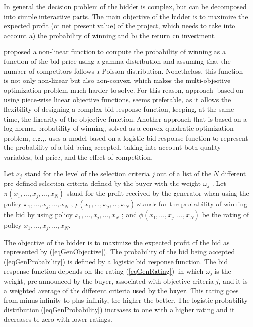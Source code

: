 \documentclass[informs]{informs3}
\begin{document}
In general the decision problem of the bidder is complex, but can be decomposed into simple interactive parts. The main objective of the bidder is to maximize the expected profit (or net present value) of the project, which needs to take into account a) the probability of winning and b) the return on investment. 


\cite{Chen_1989} proposed a non-linear function to compute the probability of winning as a function of the bid price using a gamma distribution and assuming that the number of competitors follows a Poisson distribution. Nonetheless, this function is not only non-linear but also non-convex, which makes the multi-objective optimization problem much harder to solve. For this reason,  approach, based on using piece-wise linear objective functions, seems preferable, as it allows the flexibility of designing a complex bid response function, keeping, at the same time, the linearity of the objective function. Another approach that is based on a log-normal probability of winning, solved as a convex quadratic optimization problem, e.g.,\cite{Capen_et_al_1971}. \cite[Ch. 11]{Phillips_2005} uses a model based on a logistic bid response function to represent the probability of a bid being accepted, taking into account both quality variables, bid price, and the effect of competition. 

Let $x_j$  stand for the level of the selection criteria $j$ out of a list of the $N$ different pre-defined selection criteria defined by the buyer with the weight $\omega_j$  . Let $\pi(x_1, ..., x_j, ..., x_N)$ stand for the profit received by the generator when using the policy $x_1, ..., x_j, ..., x_N$ ; $\rho(x_1, ..., x_j, ..., x_N)$  stands for the probability of winning the bid by using policy $x_1, ..., x_j, ..., x_N$ ; and $\phi(x_1, ..., x_j, ..., x_N)$  be the rating of policy $x_1, ..., x_j, ..., x_N$.       

The objective of the bidder is to maximize the expected profit of the bid as represented by (\ref{eqGenObjective}). The probability of the bid being accepted (\ref{eqGenProbability}) is defined by a logistic bid response function. The bid response function depends on the rating  (\ref{eqGenRating}), in which $\omega_j$  is the weight, pre-announced by the buyer, associated with objective criteria $j$, and it is a weighted average of the different criteria used by the buyer. This rating goes from minus infinity to plus infinity, the higher the better. The logistic probability distribution (\ref{eqGenProbability}) increases to one with a higher rating and it decreases to zero with lower ratings. 
\end{document}
